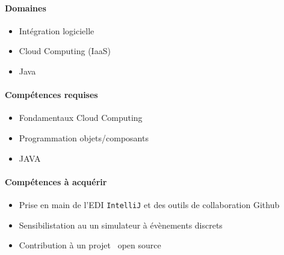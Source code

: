 \documentclass[a4paper,11pt]{article}
\begin{document}
\begin{note}


\paragraph*{Domaines}

\begin{itemize}
 \item Intégration logicielle
 \item Cloud Computing (IaaS)
 \item Java
\end{itemize}

\paragraph*{Compétences requises}

\begin{itemize}
 \item Fondamentaux Cloud Computing
 \item Programmation objets/composants
 \item JAVA 
\end{itemize}

\paragraph*{Compétences à acquérir}

\begin{itemize}
 \item Prise en main de l'EDI \texttt{IntelliJ} et des outils de collaboration Github
 \item Sensibilistation au un simulateur à évènements discrets
 \item Contribution à un projet \og~open source~\fg
\end{itemize}


\end{note}
\end{document}
